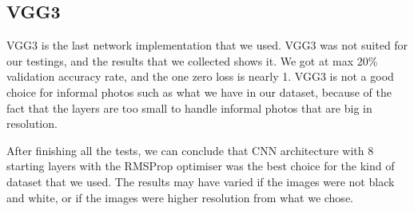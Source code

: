 \subsection{VGG3}
VGG3 is the last network implementation that we used. VGG3 was not suited for our testings, and the results that we collected shows it. We got at max 20\% validation accuracy rate, and the one zero loss is nearly 1. VGG3 is not a good choice for informal photos such as what we have in our dataset, because of the fact that the layers are too small to handle informal photos that are big in resolution. \par

After finishing all the tests, we can conclude that CNN architecture with 8 starting layers with the RMSProp optimiser was the best choice for the kind of dataset that we used. The results may have varied if the images were not black and white, or if the images were higher resolution from what we chose.

